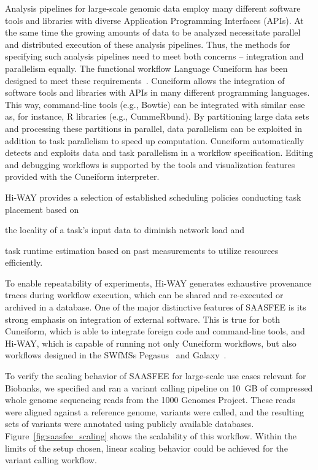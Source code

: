Analysis pipelines for large-scale genomic data employ many different software tools and libraries with diverse Application Programming Interfaces (APIs). At the same time the growing amounts of data to be analyzed necessitate parallel and distributed execution of these analysis pipelines. Thus, the methods for specifying such analysis pipelines need to meet both concerns -- integration and parallelism equally. The functional workflow Language Cuneiform has been designed to meet these requirements~\cite{Brandt2015}. Cuneiform allows the integration of software tools and libraries with APIs in many different programming languages. This way, command-line tools (e.g., Bowtie) can be integrated with similar ease as, for instance, R libraries (e.g., CummeRbund). By partitioning large data sets and processing these partitions in parallel, data parallelism can be exploited in addition to task parallelism to speed up computation. Cuneiform automatically detects and exploits data and task parallelism in a workflow specification. Editing and debugging workflows is supported by the tools and visualization features provided with the Cuneiform interpreter.

Hi-WAY provides a selection of established scheduling policies conducting task placement based on
\begin{inparaenum}[(a)]
  \item the locality of a task's input data to diminish network load and
  \item task runtime estimation based on past measurements to utilize resources efficiently.
\end{inparaenum}
To enable repeatability of experiments, Hi-WAY generates exhaustive provenance traces during workflow execution, which can be shared and re-executed or archived in a database. One of the major distinctive features of SAASFEE is its strong emphasis on integration of external software. This is true for both Cuneiform, which is able to integrate foreign code and command-line tools, and Hi-WAY, which is capable of running not only Cuneiform workflows, but also workflows designed in the SWfMSs Pegasus~\cite{pegasus_fgcs} and Galaxy~\cite{Goecks10}.

To verify the scaling behavior of SAASFEE for large-scale use cases relevant for Biobanks, we specified and ran a variant calling pipeline on 10~GB of compressed whole genome sequencing reads from the 1000 Genomes Project. These reads were aligned against a reference genome, variants were called, and the resulting sets of variants were annotated using publicly available databases. Figure~\ref{fig:saasfee_scaling} shows the scalability of this workflow. Within the limits of the setup chosen, linear scaling behavior could be achieved for the variant calling workflow.

